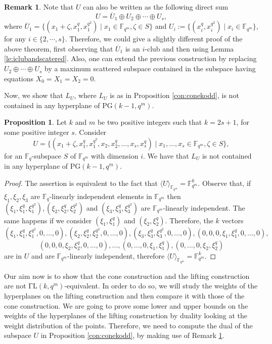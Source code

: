 \documentclass[11pt]{amsart}
\theoremstyle{definition}
\newtheorem{proposition}[theorem]{Proposition}
\newtheorem{remark}[theorem]{Remark}
\newcommand{\fq}{{\mathbb F}_{q}}
\newcommand{\la}{\langle}
\newcommand{\ra}{\rangle}
\newcommand{\fqm}{\mathbb{F}_{q^m}}
\begin{document}
\begin{remark}\label{rem:directsumliftconstrkodd}
    Note that $U$ can also be written as the following direct sum
    $$U=\overline{U}_1\oplus U_2\oplus \cdots \oplus U_s,$$
     where $\overline{U}_1=\{(x_1+\zeta,x_1^q,x_1^{q^2})\mid x_1\in\fqm,\zeta \in S\}$ and $U_i:=\{(x_i^q,x_i^{q^2})\mid x_i\in\fqm\}$, for any $i\in \{2,\cdots, s\}$.
     Therefore, we could give a slightly different proof of the above theorem, first observing that $\overline{U}_1$ is an $i$-club and then using Lemma \ref{le:iclubandscatered}.
     Also, one can extend the previous construction by replacing $U_2\oplus \cdots \oplus U_s$ by a maximum scattered subspace contained in the subspace having equations $X_0=X_1=X_2=0$.
\end{remark}

Now, we show that $L_U$, where $L_U$ is as in Proposition \ref{con:conekodd}, is not contained in any hyperplane of $\mathrm{PG}(k-1,q^m)$.

\begin{proposition}
    Let $k$ and $m$ be two positive integers such that $k=2s+1$, for some positive integer $s$.
    Consider
    $$U=\{(x_1+\zeta,x_1^q,x_1^{q^2}, x_2, x_2^{q}, \ldots, x_s,x_s^{q} )\mid x_1,\ldots,x_s\in \mathbb{F}_{q^m}, \zeta\in S\},$$
    for an $\fq$-subspace $S$ of $\fqm$ with dimension $i$. We have that $L_U$ is not contained in any hyperplane of $\mathrm{PG}(k-1,q^m)$.
\end{proposition}
\begin{proof}
    The assertion is equivalent to the fact that $\la U \ra_{\fqm}=\fqm^k$.
    Observe that, if $\xi_1,\xi_2,\xi_3$ are $\fq$-linearly independent elements in $\fqm$ then
    $(\xi_1,\xi_1^q,\xi_1^{q^2}),(\xi_2,\xi_2^q,\xi_2^{q^2})$ and $(\xi_3,\xi_3^q,\xi_3^{q^2})$ are $\fqm$-linearly independent.
    The same happens if we consider $(\xi_1,\xi_1^q)$ and $(\xi_2,\xi_2^q)$.
    Therefore, the $k$ vectors
    \[ (\xi_1,\xi_1^q,\xi_1^{q^2},0,\ldots,0),(\xi_2,\xi_2^q,\xi_2^{q^2},0,\ldots,0),(\xi_3,\xi_3^q,\xi_3^{q^2},0,\ldots,0),
    (0,0,0,\xi_1,\xi_1^q,0,\ldots,0),\]
    \[(0,0,0,\xi_2,\xi_2^q,0,\ldots,0),\ldots, (0,\ldots,0,\xi_1,\xi_1^q), (0,\ldots,0,\xi_2,\xi_2^q)
    \]
    are in $U$ and are $\fqm$-linearly independent, therefore $\la U \ra_{\fqm}=\fqm^k$.
\end{proof}

Our aim now is to show that the cone construction and the lifting construction are not $\mathrm{\Gamma L}(k,q^m)$-equivalent.
In order to do so, we will study the weights of the hyperplanes on the lifting construction and then compare it with those of the cone construction.
We are going to prove some lower and upper bounds on the weights of the hyperplanes of the lifting construction by duality looking at the weight distribution of the points.
Therefore, we need to compute the dual of the subspace $U$ in Proposition \ref{con:conekodd}, by making use of Remark \ref{rem:directsumliftconstrkodd}.
\end{document}
